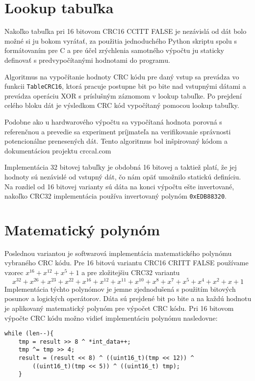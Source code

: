 \documentclass[../projekt.tex]{subfiles}
\begin{document}
\section{Lookup tabuľka}
Nakoľko tabuľka pri 16 bitovom CRC16 CCITT FALSE je nezávislá od dát bolo možné si ju bokom vyrátať, za použitia jednoduchého Python skriptu spolu s formátovaním pre C a pre účel zrýchlenia samotného výpočtu ju staticky definovať s predvypočítanými hodnotami do programu. 

Algoritmus na vypočítanie hodnoty CRC kódu pre daný vstup sa prevádza vo funkcii \texttt{TableCRC16}\cite{crc}, ktorá pracuje postupne bit po bite nad vstupnými dátami a prevádza operáciu XOR s príslušným záznomom v lookup tabuľke. Po prejdení celého bloku dát je výsledkom CRC kód vypočítaný pomocou lookup tabuľky. 

Podobne ako u hardwarového výpočtu sa vypočítaná hodnota porovná s referenčnou a prevedie sa experiment príjmateľa na verifikovanie správnosti potencionálne prenesených dát. Tento algoritmus bol inšpirovaný kódom a dokumentáciou projektu crccal.com\cite{crc}

Implementácia 32 bitovej tabuľky je obdobná 16 bitovej a taktiež platí, že jej hodnoty sú nezávislé od vstupný dát, čo nám opäť umožnilo statickú definíciu. Na rozdiel od 16 bitovej varianty sú dáta na konci výpočtu ešte invertované, nakoľko CRC32 implementácia používa invertovaný polynóm \texttt{0xEDB88320}\cite{wiki}.

\section{Matematický polynóm}
Poslednou variantou je softwarová implementácia matematického polynómu vybraného CRC kódu. Pre 16 bitovú variantu CRC16 CRITT FALSE používame vzorec $x^{16}+x^{12}+x^{5}+1$ a pre zložitejšiu CRC32 variantu $$x^{32}+x^{26}+x^{23}+x^{22}+x^{16}+x^{12}+x^{11}+x^{10}+x^{8}+x^{7}+x^{5}+x^{4}+x^{2}+x+1$$
Implementácia týchto polynómov je jemne zjednodušená s použitím bitových posunov a logických operátorov. Dáta sú prejdené bit po bite a na každú hodnotu je aplikovaný matematický polynóm pre výpočet CRC kódu. Pri 16 bitovom výpočte CRC kódu možno vidieť implementáciu polynómu nasledovne: 
\begin{lstlisting}
while (len--){
	tmp = result >> 8 ^ *int_data++;
	tmp ^= tmp >> 4;
	result = (result << 8) ^ ((uint16_t)(tmp << 12)) ^ 
		((uint16_t)(tmp << 5)) ^ ((uint16_t) tmp);
	}
\end{lstlisting}
\end{document}
